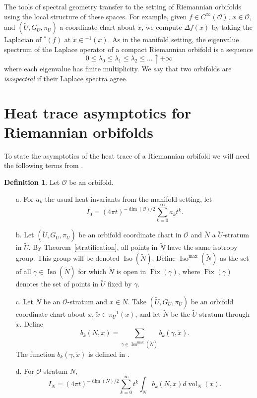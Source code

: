 \documentclass{amsart}
\theoremstyle{plain}
\theoremstyle{definition}
\newtheorem{defn}[thm]{Definition}
\theoremstyle{remark}
\newcommand{\ld}{\lambda}
\newcommand{\wtu}{\widetilde{U}}
\newcommand{\orb}{\mathcal O}
\newcommand{\cc}{(\widetilde{U}, G_U, \pi_U)}
\DeclareMathOperator{\iso}{Iso}
\DeclareMathOperator{\fix}{Fix}
\DeclareMathOperator{\vol}{vol}
\begin{document}
The tools of spectral geometry transfer to the setting of Riemannian
orbifolds using the local structure of these spaces. For example, given
$f\in C^\infty(\orb)$, $x\in \orb$, and $\cc$ a coordinate chart about $x$,
we compute $\Delta f (x)$ by taking the Laplacian of
$^*(f)$  at $\tilde{x} \in
$$^{-1}(x)$.  As in the manifold setting, the eigenvalue spectrum of the Laplace operator of a compact Riemannian orbifold is a sequence
$$
0 \le \ld_0 \le \ld_1 \le \ld_2 \le\dots \uparrow +\infty
$$
where each eigenvalue has finite multiplicity.  We say that two orbifolds are \emph{isospectral} if their Laplace spectra agree.



\section{Heat trace asymptotics for Riemannian orbifolds}

To state the asymptotics of the heat trace of a Riemannian orbifold we will need the following terms from \cite{dggw}.

\begin{defn} Let $\orb$ be an orbifold.
\begin{itemize}
\item[a.] For $a_k$ the usual heat invariants from the manifold setting, let $$I_0=(4\pi t)^{-\dim(\orb)/2} \sum_{k=0}^\infty a_k t^k.$$ 
\item[b.] Let  $(\widetilde{U}, G_U, \pi_U)$ be an orbifold coordinate chart in $\orb$ and $\widetilde{N}$ a $\wtu$-stratum in $\wtu$. By Theorem~\ref{stratification}, all points in $\widetilde{N}$ have the same isotropy group.  This group will be denoted $\iso(\widetilde{N})$.  Define $\iso^{\max}(\widetilde{N})$ as the set of all $\gamma \in \iso(\widetilde{N})$ for which $\widetilde{N}$ is open in $\fix(\gamma)$, where $\fix(\gamma)$ denotes the set of points in $\wtu$ fixed by $\gamma$.
\item[c.] Let $N$ be an $\orb$-stratum and $x\in N$.  Take $(\widetilde{U}, G_U, \pi_U)$ be an orbifold coordinate chart about $x$, $\tilde x \in \pi_U^{-1}(x)$, and let $\widetilde{N}$ be the $\widetilde{U}$-stratum through $\tilde x$.  Define
 \[b_k(N,x) = \sum_{\gamma \in \iso^{\max}(\widetilde{N})} b_k(\gamma,\tilde{x}).\]
 The function $b_k(\gamma,\tilde{x})$ is defined in \cite[Section 4.2]{dggw}.
\item[d.] For $\orb$-stratum $N$, $$I_N=(4\pi t)^{-\dim(N)/2}\sum_{k=0}^\infty t^k \int_N b_k(N,x) d\vol_N(x).$$
\end{itemize}
\end{defn}
\end{document}
